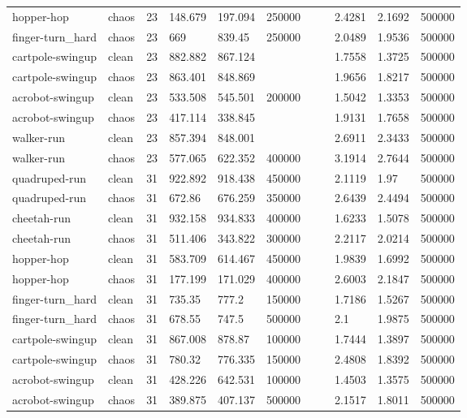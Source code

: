 \begin{tabular}{lllllllllll}
hopper-hop & chaos & 23 & 148.679 & 197.094 & 250000 &  &  & 2.4281 & 2.1692 & 500000 \\
finger-turn\_hard & chaos & 23 & 669 & 839.45 & 250000 &  &  & 2.0489 & 1.9536 & 500000 \\
cartpole-swingup & clean & 23 & 882.882 & 867.124 &  &  &  & 1.7558 & 1.3725 & 500000 \\
cartpole-swingup & chaos & 23 & 863.401 & 848.869 &  &  &  & 1.9656 & 1.8217 & 500000 \\
acrobot-swingup & clean & 23 & 533.508 & 545.501 & 200000 &  &  & 1.5042 & 1.3353 & 500000 \\
acrobot-swingup & chaos & 23 & 417.114 & 338.845 &  &  &  & 1.9131 & 1.7658 & 500000 \\
walker-run & clean & 23 & 857.394 & 848.001 &  &  &  & 2.6911 & 2.3433 & 500000 \\
walker-run & chaos & 23 & 577.065 & 622.352 & 400000 &  &  & 3.1914 & 2.7644 & 500000 \\
quadruped-run & clean & 31 & 922.892 & 918.438 & 450000 &  &  & 2.1119 & 1.97 & 500000 \\
quadruped-run & chaos & 31 & 672.86 & 676.259 & 350000 &  &  & 2.6439 & 2.4494 & 500000 \\
cheetah-run & clean & 31 & 932.158 & 934.833 & 400000 &  &  & 1.6233 & 1.5078 & 500000 \\
cheetah-run & chaos & 31 & 511.406 & 343.822 & 300000 &  &  & 2.2117 & 2.0214 & 500000 \\
hopper-hop & clean & 31 & 583.709 & 614.467 & 450000 &  &  & 1.9839 & 1.6992 & 500000 \\
hopper-hop & chaos & 31 & 177.199 & 171.029 & 400000 &  &  & 2.6003 & 2.1847 & 500000 \\
finger-turn\_hard & clean & 31 & 735.35 & 777.2 & 150000 &  &  & 1.7186 & 1.5267 & 500000 \\
finger-turn\_hard & chaos & 31 & 678.55 & 747.5 & 500000 &  &  & 2.1 & 1.9875 & 500000 \\
cartpole-swingup & clean & 31 & 867.008 & 878.87 & 100000 &  &  & 1.7444 & 1.3897 & 500000 \\
cartpole-swingup & chaos & 31 & 780.32 & 776.335 & 150000 &  &  & 2.4808 & 1.8392 & 500000 \\
acrobot-swingup & clean & 31 & 428.226 & 642.531 & 100000 &  &  & 1.4503 & 1.3575 & 500000 \\
acrobot-swingup & chaos & 31 & 389.875 & 407.137 & 500000 &  &  & 2.1517 & 1.8011 & 500000 \\

\end{tabular}
